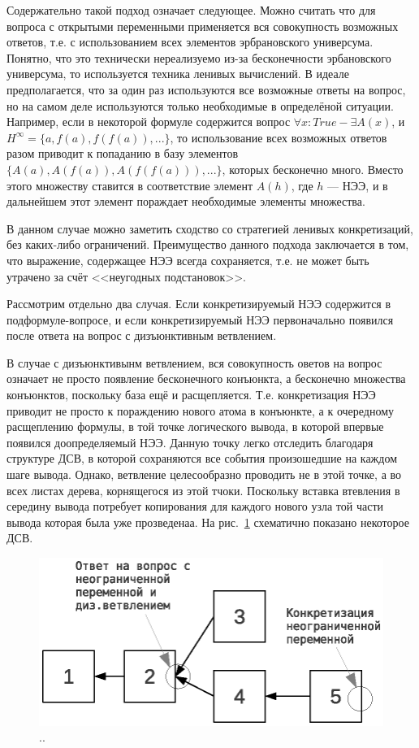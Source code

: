 Содержательно такой подход означает следующее. Можно считать что для вопроса с открытыми переменными применяется вся совокупность возможных ответов, т.е. с использованием всех элементов эрбрановского универсума. Понятно, что это технически нереализуемо из-за бесконечности эрбановского универсума, то используется техника ленивых вычислений. В идеале предполагается, что за один раз используются все возможные ответы на вопрос, но на самом деле используются только необходимые в определёной ситуации. Например, если в некоторой формуле содержится вопрос $\forall x: True  - \exists A(x)$, и $H^{\infty}= \{a, f(a), f(f(a)), ...\}$, то использование всех возможных ответов разом приводит к попаданию в базу элементов $\{A(a), A(f(a)), A(f(f(a))), ...\}$, которых бесконечно много. Вместо этого множеству ставится в соответствие элемент $A(h)$, где $h$ --- НЭЭ, и в дальнейшем этот элемент пораждает необходимые элементы множества. 

В данном случае можно заметить сходство со стратегией ленивых конкретизаций, без каких-либо ограничений. Преимущество данного подхода заключается в том, что выражение, содержащее НЭЭ всегда сохраняется, т.е. не может быть утрачено за счёт <<неугодных подстановок>>. 

Рассмотрим отдельно два случая. Если конкретизируемый НЭЭ содержится в подформуле-вопросе, и если конкретизируемый НЭЭ первоначально появился после ответа на вопрос с дизъюнктивным ветвлением. 

В случае с дизъюнктивынм ветвлением, вся совокупность оветов на вопрос означает не просто появление бесконечного конъюнкта, а бесконечно множества конъюнктов, поскольку база ещё и расщепляется. Т.е. конкретизация НЭЭ приводит не просто к пораждению нового атома в конъюнкте, а к очередному расщеплению формулы, в той точке логического вывода, в которой впервые появился доопределяемый НЭЭ. Данную точку легко отследить благодаря структуре ДСВ, в которой сохраняются все события произошедшие на каждом шаге вывода. Однако, ветвление целесообразно проводить не в этой точке, а во всех листах дерева, корнящегося из этой тчоки. Поскольку вставка втевления в середину вывода потребует копирования для каждого нового узла той части вывода которая была уже прозведенаа.  На рис.~\ref{lazy21} схематично показано некоторое ДСВ.

\begin{figure}[h]
	\centering
	\includegraphics[width=0.5\linewidth]{pics/Lazy21.eps}
	\caption{..}
	\label{lazy21}
\end{figure}

